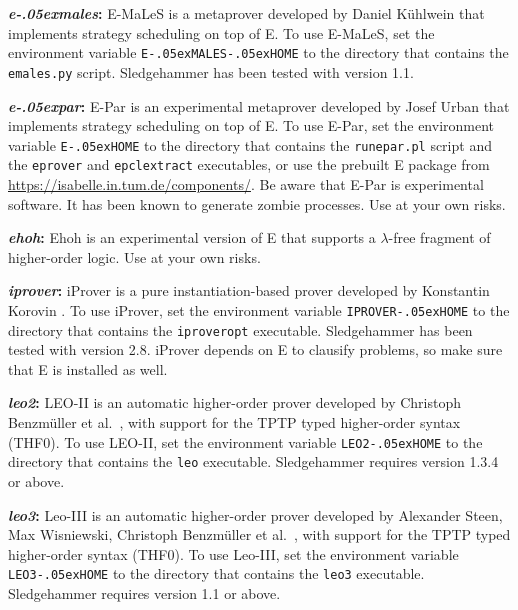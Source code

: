\documentclass[a4paper,12pt]{article}
\newcommand\download{\url{https://isabelle.in.tum.de/components/}}
\renewcommand\_{\hbox{\textunderscore\kern-.05ex}}
\begin{document}
\begin{enum}
\begin{sloppy}
\begin{enum}
\item[\labelitemi] \textbf{\textit{e\_males}:} E-MaLeS is a metaprover developed
by Daniel K\"uhlwein that implements strategy scheduling on top of E. To use
E-MaLeS, set the environment variable \texttt{E\_MALES\_HOME} to the directory
that contains the \texttt{emales.py} script. Sledgehammer has been tested with
version 1.1.

\item[\labelitemi] \textbf{\textit{e\_par}:} E-Par is an experimental metaprover
developed by Josef Urban that implements strategy scheduling on top of E. To use
E-Par, set the environment variable \texttt{E\_HOME} to the directory that
contains the \texttt{runepar.pl} script and the \texttt{eprover} and
\texttt{epclextract} executables, or use the prebuilt E package from \download.
Be aware that E-Par is experimental software. It has been known to generate
zombie processes. Use at your own risks.

\item[\labelitemi] \textbf{\textit{ehoh}:} Ehoh is an experimental version of
E that supports a $\lambda$-free fragment of higher-order logic. Use at your
own risks.

\item[\labelitemi] \textbf{\textit{iprover}:} iProver is a pure
instantiation-based prover developed by Konstantin Korovin
\cite{korovin-2009}. To use iProver, set the environment variable
\texttt{IPROVER\_HOME} to the directory that contains the \texttt{iproveropt}
executable. Sledgehammer has been tested with version 2.8. iProver depends on
E to clausify problems, so make sure that E is installed as well.

\item[\labelitemi] \textbf{\textit{leo2}:} LEO-II is an automatic
higher-order prover developed by Christoph Benzm\"uller et al.\ \cite{leo2},
with support for the TPTP typed higher-order syntax (THF0). To use LEO-II, set
the environment variable \texttt{LEO2\_HOME} to the directory that contains the
\texttt{leo} executable. Sledgehammer requires version 1.3.4 or above.

\item[\labelitemi] \textbf{\textit{leo3}:} Leo-III is an automatic
higher-order prover developed by Alexander Steen, Max Wisniewski, Christoph
Benzm\"uller et al.\ \cite{leo3},
with support for the TPTP typed higher-order syntax (THF0). To use Leo-III, set
the environment variable \texttt{LEO3\_HOME} to the directory that contains the
\texttt{leo3} executable. Sledgehammer requires version 1.1 or above.


\end{enum}
\end{sloppy}
\end{enum}
\end{document}
